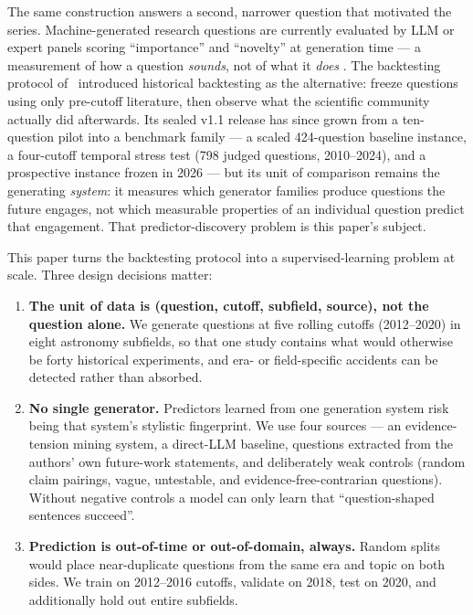 \documentclass[11pt]{article}
\begin{document}
The same construction answers a second, narrower question that motivated the
series. Machine-generated research questions are currently evaluated by LLM
or expert panels scoring ``importance'' and ``novelty'' at generation time
--- a measurement of how a question \emph{sounds}, not of what it
\emph{does} \cite{si2024}. The backtesting protocol of~\cite{paper2} introduced
historical backtesting as the alternative: freeze questions using only
pre-cutoff literature, then
observe what the scientific community actually did afterwards. Its
sealed v1.1 release has since grown from a ten-question pilot into a
benchmark family --- a scaled 424-question baseline instance, a
four-cutoff temporal stress test (798 judged questions, 2010--2024), and
a prospective instance frozen in 2026 --- but its unit of comparison
remains the generating \emph{system}: it measures which generator
families produce questions the future engages, not which measurable
properties of an individual question predict that engagement. That
predictor-discovery problem is this paper's subject.

This paper turns the backtesting protocol into a supervised-learning
problem at scale. Three design decisions matter:

\begin{enumerate}
  \item \textbf{The unit of data is (question, cutoff, subfield, source),
    not the question alone.} We generate questions at five rolling
    cutoffs (2012--2020) in eight astronomy subfields, so that one study
    contains what would otherwise be forty historical experiments, and
    era- or field-specific accidents can be detected rather than
    absorbed.
  \item \textbf{No single generator.} Predictors learned from one
    generation system risk being that system's stylistic fingerprint. We
    use four sources --- an evidence-tension mining system, a direct-LLM
    baseline, questions extracted from the authors' own future-work
    statements, and deliberately weak controls (random claim pairings,
    vague, untestable, and evidence-free-contrarian questions). Without
    negative controls a model can only learn that ``question-shaped
    sentences succeed''.
  \item \textbf{Prediction is out-of-time or out-of-domain, always.}
    Random splits would place near-duplicate questions from the same era
    and topic on both sides. We train on 2012--2016 cutoffs, validate on
    2018, test on 2020, and additionally hold out entire subfields.
\end{enumerate}
\end{document}
